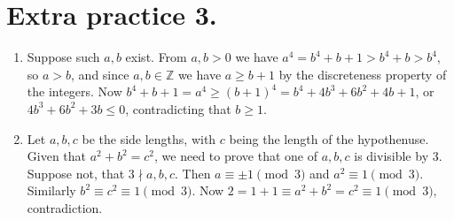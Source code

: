 \documentclass[11pt]{article}
\begin{document}
\section {Extra practice 3.}
\begin{enumerate}
\item Suppose such $a,b$ exist. From $a,b>0$ we have $a^4=b^4+b+1>b^4+b>b^4$, so $a>b$, and since $a,b\in\mathbb{Z}$ we have $a\ge b+1$ by the discreteness property of the integers. Now $b^4+b+1=a^4\ge (b+1)^4=b^4+4b^3+6b^2+4b+1$, or $4b^3+6b^2+3b\le 0$, contradicting that $b\ge 1$.

\item Let $a,b,c$ be the side lengths, with $c$ being the length of the hypothenuse. Given that $a^2+b^2=c^2$, we need to prove that one of $a,b,c$ is divisible by 3. Suppose not, that $3\nmid a, b, c$. Then $a\equiv \pm 1\pmod {3}$ and $a^2\equiv 1\pmod {3}$. Similarly $b^2\equiv c^2\equiv 1\pmod {3}$. Now $2=1+1\equiv a^2+b^2=c^2\equiv 1\pmod {3},$ contradiction.
\end{enumerate}
\end{document}
